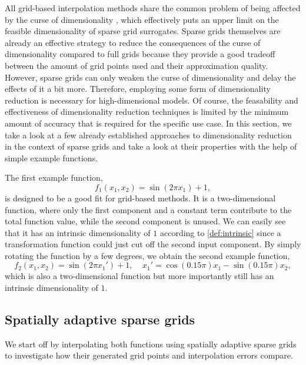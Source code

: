 \documentclass[
  a4paper,  %
  twoside,  %
  bibliography=totoc,
  headsepline,
  cleardoublepage=empty,
  parskip=half,
  draft=false
]{scrbook}
\begin{document}
All grid-based interpolation methods share the common problem of being affected by the curse of dimensionality \cite{Bellman1961}, which effectively puts an upper limit on the feasible dimensionality of sparse grid surrogates.
Sparse grids themselves are already an effective strategy to reduce the consequences of the curse of dimensionality compared to full grids because they provide a good tradeoff between the amount of grid points used and their approximation quality.
However, sparse grids can only weaken the curse of dimensionality and delay the effects of it a bit more.
Therefore, employing some form of dimensionality reduction is necessary for high-dimensional models.
Of course, the feasability and effectiveness of dimensionality reduction techniques is limited by the minimum amount of accuracy that is required for the specific use case.
In this section, we take a look at a few already established approaches to dimensionality reduction in the context of sparse grids and take a look at their properties with the help of simple example functions.

The first example function,
\begin{equation}
f_1(x_1, x_2)=\sin(2 \pi x_1) + 1,
\end{equation}
is designed to be a good fit for grid-based methods.
It is a two-dimensional function, where only the first component and a constant term contribute to the total function value, while the second component is unused.
We can easily see that it has an intrinsic dimensionality of $1$ according to \cref{def:intrinsic} since a transformation function could just cut off the second input component.
By simply rotating the function by a few degrees, we obtain the second example function,
\begin{equation}
f_2(x_1,x_2)=\sin(2 \pi x_1') + 1, ~~~~~ x_1'=\cos(0.15 \pi) x_1 -\sin(0.15 \pi) x_2,
\end{equation}
which is also a two-dimensional function but more importantly still has an intrinsic dimensionality of $1$.

\subsection{Spatially adaptive sparse grids}

We start off by interpolating both functions using spatially adaptive sparse grids to investigate how their generated grid points and interpolation errors compare.
\end{document}

